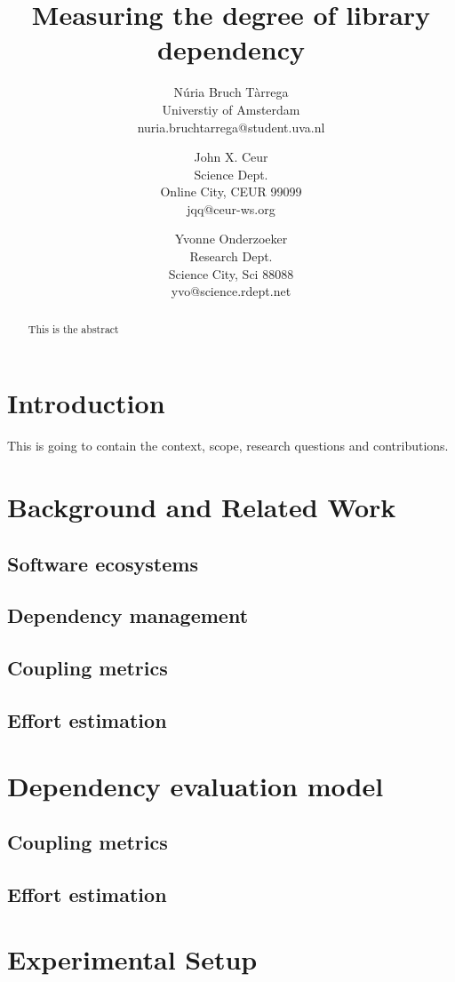 \documentclass[a4paper]{article}
\title{Measuring the degree of library dependency}
\author{
Núria Bruch Tàrrega \\ Universtiy of Amsterdam \\ nuria.bruchtarrega@student.uva.nl
\and
John X. Ceur \\ Science Dept.\\
                Online City, CEUR 99099 \\ jqq@ceur-ws.org
\and
Yvonne Onderzoeker \\ Research Dept.\\
                Science City, Sci 88088 \\ yvo@science.rdept.net
}
\begin{document}
\maketitle

\begin{abstract}
This is the abstract
\end{abstract}


\section{Introduction}

This is going to contain the context, scope, research questions and contributions.

\section{Background and Related Work}

\subsection{Software ecosystems}
\subsection{Dependency management}
\subsection{Coupling metrics}
\subsection{Effort estimation}


\section{Dependency evaluation model}

\subsection{Coupling metrics}
\subsection{Effort estimation}


\section{Experimental Setup}
\end{document}
